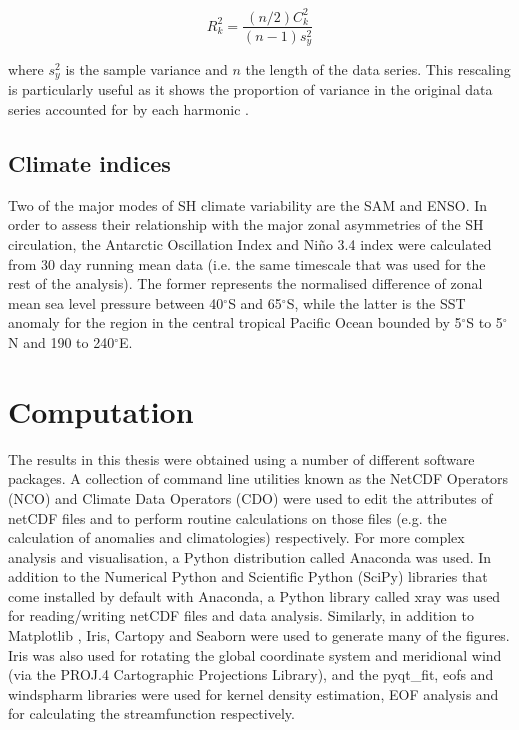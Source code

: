 \begin{equation}\label{eq:variance_explained}
R_k^2 = \frac{(n/2)C_k^2}{(n-1)s_y^2}
\end{equation}

\noindent where $s_y^2$ is the sample variance and $n$ the length of the data series. This rescaling is particularly useful as it shows the proportion of variance in the original data series accounted for by each harmonic \citep{Wilks2011}.

\subsection{Climate indices}
Two of the major modes of SH climate variability are the SAM and ENSO. In order to assess their relationship with the major zonal asymmetries of the SH circulation, the Antarctic Oscillation Index \citep[AOI;][]{Gong1999} and Ni\~{n}o 3.4 index \citep{Trenberth2001} were calculated from 30 day running mean data (i.e. the same timescale that was used for the rest of the analysis). The former represents the normalised difference of zonal mean sea level pressure between 40$^{\circ}$S and 65$^{\circ}$S, while the latter is the SST anomaly for the region in the central tropical Pacific Ocean bounded by 5$^{\circ}$S to 5$^{\circ}$N and 190 to 240$^{\circ}$E. 


\section{Computation}\label{s:computation}


The results in this thesis were obtained using a number of different software packages. A collection of command line utilities known as the NetCDF Operators (NCO) and Climate Data Operators (CDO) were used to edit the attributes of netCDF files and to perform routine calculations on those files (e.g. the calculation of anomalies and climatologies) respectively. For more complex analysis and visualisation, a Python distribution called Anaconda was used. In addition to the Numerical Python \citep[NumPy;][]{VanDerWalt2011} and Scientific Python (SciPy) libraries that come installed by default with Anaconda, a Python library called xray was used for reading/writing netCDF files and data analysis. Similarly, in addition to Matplotlib \citep[the default Python plotting library;][]{Hunter2007}, Iris, Cartopy and Seaborn were used to generate many of the figures. Iris was also used for rotating the global coordinate system and meridional wind (via the PROJ.4 Cartographic Projections Library), and the pyqt\_fit, eofs and windspharm libraries were used for kernel density estimation, EOF analysis and for calculating the streamfunction respectively.

